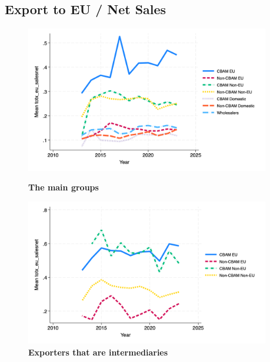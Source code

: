 \documentclass{article}
\begin{document}
\subsection{Export to EU / Net Sales}
\begin{figure}[H]
\centering
\includegraphics[width=0.95\textwidth]{totx_eu_salesnet_main_groups.png}
\caption{\textbf{The main groups}}
\includegraphics[width=0.95\textwidth]{totx_eu_salesnet_ei.png}
\caption{\textbf{Exporters that are intermediaries}}
\end{figure}
\end{document}
